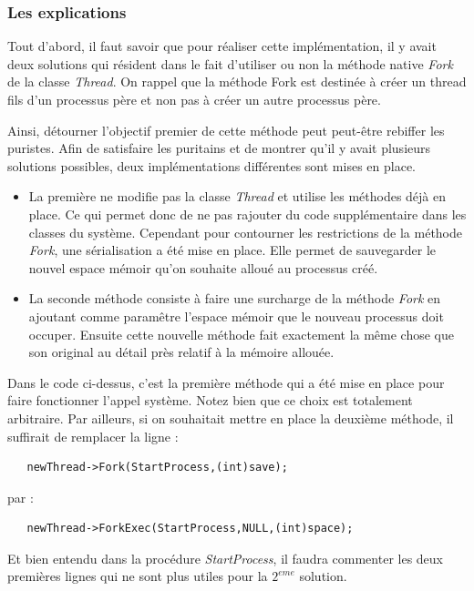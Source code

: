 \documentclass[a4paper,10pt]{article}
\begin{document}
    \newpage
  \textcolor{TealBlue}{\subsubsection*{Les explications}}
    Tout d'abord, il faut savoir que pour réaliser cette implémentation, il y avait deux solutions qui résident dans le fait d'utiliser ou non la méthode
    native \emph{Fork} de la classe \emph{Thread}. On rappel que la méthode Fork est destinée à créer un thread fils d'un processus père et non pas à 
    créer un autre processus père. 
    
    Ainsi, détourner l'objectif premier de cette méthode peut peut-être rebiffer les puristes. Afin de satisfaire les puritains et de montrer qu'il y avait plusieurs
    solutions possibles, deux implémentations différentes sont mises en place. 
    
    \begin{itemize}
     \item La première ne modifie pas la classe \emph{Thread} et utilise les méthodes
    déjà en place. Ce qui permet donc de ne pas rajouter du code supplémentaire dans les classes du système. Cependant pour contourner les restrictions
    de la méthode \emph{Fork}, une sérialisation a été mise en place. Elle permet de sauvegarder le nouvel espace mémoir qu'on souhaite alloué au 
    processus créé.
    
    \item La seconde méthode consiste à faire une surcharge de la méthode \emph{Fork} en ajoutant comme paramêtre l'espace mémoir que le nouveau processus
    doit occuper. Ensuite cette nouvelle méthode fait exactement la même chose que son original au détail près relatif à la mémoire allouée.
    \end{itemize}
  Dans le code ci-dessus, c'est la première méthode qui a été mise en place pour faire fonctionner l'appel système. Notez bien que ce choix est totalement 
  arbitraire. 
  Par ailleurs, si on souhaitait mettre en place la deuxième méthode, il suffirait de remplacer la ligne : 
  \begin{lstlisting}
   newThread->Fork(StartProcess,(int)save);
  \end{lstlisting}
  par : 
  \begin{lstlisting}
   newThread->ForkExec(StartProcess,NULL,(int)space);
  \end{lstlisting}
  Et bien entendu dans la procédure \emph{StartProcess}, il faudra commenter les deux premières lignes qui ne sont plus utiles pour la $2^{eme}$ solution.
  
\end{document}
